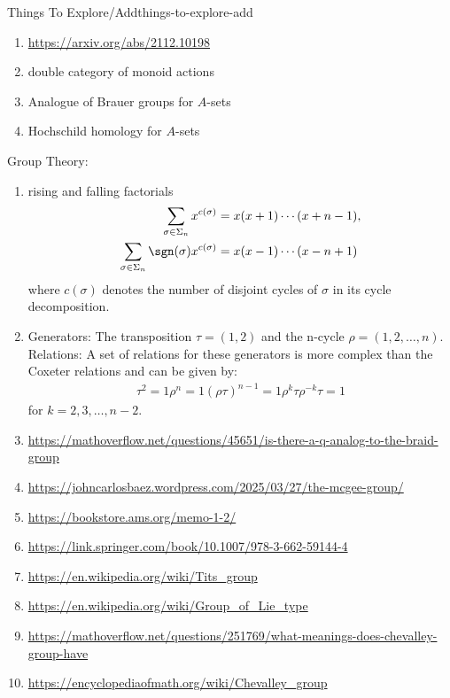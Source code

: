 \begin{remark}{Things To Explore/Add}{things-to-explore-add}
\begin{enumerate}
\begin{enumerate}
            \end{enumerate}
        \item \url{https://arxiv.org/abs/2112.10198}
        \item double category of monoid actions
        \item Analogue of Brauer groups for $A$-sets
        \item Hochschild homology for $A$-sets
    \end{enumerate}
    Group Theory:
    \begin{enumerate}
        \item rising and falling factorials
            \begin{align*}
                \sum_{\sigma\in\Sigma_{n}}x^{c(\sigma)}             &= x(x+1)\cdots(x+n-1),\\
                \sum_{\sigma\in\Sigma_{n}}\sgn(\sigma)x^{c(\sigma)} &= x(x-1)\cdots(x-n+1)
            \end{align*}
            where $c(\sigma)$ denotes the number of disjoint cycles of $\sigma$ in its cycle decomposition.
        \item Generators: The transposition $\tau=(1,2)$ and the n-cycle $\rho=(1,2,\ldots,n)$. Relations: A set of relations for these generators is more complex than the Coxeter relations and can be given by:
            \begin{gather*}
                \tau^{2}                  = 1
                \rho^{n}                  = 1
                (\rho\tau)^{n−1}          = 1
                \rho^{k}\tau\rho^{-k}\tau = 1
            \end{gather*}
            for $k=2,3,\ldots,n−2$.
        \item \url{https://mathoverflow.net/questions/45651/is-there-a-q-analog-to-the-braid-group}
        \item \url{https://johncarlosbaez.wordpress.com/2025/03/27/the-mcgee-group/}
        \item \url{https://bookstore.ams.org/memo-1-2/}
        \item \url{https://link.springer.com/book/10.1007/978-3-662-59144-4}
        \item \url{https://en.wikipedia.org/wiki/Tits_group}
        \item \url{https://en.wikipedia.org/wiki/Group_of_Lie_type} \item \url{https://mathoverflow.net/questions/251769/what-meanings-does-chevalley-group-have}
        \item \url{https://encyclopediaofmath.org/wiki/Chevalley\_group}

\end{enumerate}
\end{remark}
